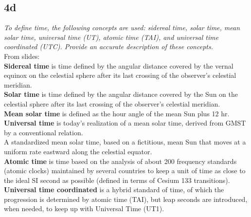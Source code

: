 \subsection{4d}
\textit{To define time, the following concepts are used: sidereal time, solar time, mean solar time, universal time (UT), atomic time (TAI), and universal time coordinated (UTC). Provide an accurate description of these concepts.} \\

From slides:\\
\textbf{Sidereal time} is time defined by the angular distance covered by the vernal equinox on the celestial sphere after its last crossing of the observer’s celestial meridian.\\
\textbf{Solar time} is time defined by the angular distance covered by the Sun on the celestial sphere after its last crossing of the observer’s celestial meridian.\\
\textbf{Mean solar time} is defined as the hour angle of the mean Sun plus 12 hr.\\
\textbf{Universal time} is today’s realization of a mean solar time, derived from GMST by a conventional relation.\\
A standardized mean solar time, based on a fictitious, mean Sun that moves at a uniform rate eastward along the celestial equator.\\
\textbf{Atomic time} is time based on the analysis of about 200 frequency standards (atomic clocks) maintained by several countries to keep a unit of time as close to the ideal SI second as possible (defined in terms of Cesium 133 transitions).\\
\textbf{Universal time coordinated} is a hybrid standard of time, of which the progression is determined by atomic time (TAI), but leap seconds are introduced, when needed, to keep up with Universal Time (UT1).
